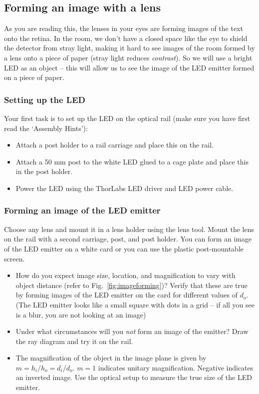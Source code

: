 \documentclass[a4paper]{report}
\begin{document}
    \subsection{Forming an image with a lens}
	\hypertarget{hintBack-image}{}
	As you are reading this, the lenses in your eyes are forming images of the text onto the retina.
	In the room, we don't have a closed space like the eye to shield the detector from stray light, making it hard to see images of the room formed by a lens onto a piece of paper (stray light reduces \emph{contrast}).
	So we will use a bright LED as an object -- this will allow us to see the image of the LED emitter formed on a piece of paper.

	\subsubsection{Setting up the LED}
	Your first task is to set up the LED on the optical rail (make sure you have first read the `Assembly Hints'):
	\begin{itemize}
    \item Attach a post holder to a rail carriage and place this on the rail.
    \item Attach a 50 mm post to the white LED glued to a cage plate and place this in the post holder.
    \item Power the LED using the ThorLabs LED driver and LED power cable.
	\end{itemize}

	\subsubsection{Forming an image of the LED emitter}
	Choose any lens and mount it in a lens holder using the lens tool.
	Mount the lens on the rail with a second carriage, post, and post holder.
	You can form an image of the LED emitter on a white card or you can use the plastic post-mountable screen.

    \begin{itemize}
	    \item How do you expect image size, location, and magnification to vary with object distance (refer to Fig.~\ref{fig:imageforming})? Verify that these are true by forming images of the LED emitter on the card for different values of $d_o$. (The LED emitter looks like a small square with dots in a grid -- if all you see is a blur, you are not looking at an image)
	    \item Under what circumstances will you \emph{not} form an image of the emitter? Draw the ray diagram and try it on the rail.
	    \item The magnification of the object in the image plane is given by  $m = h_i / h_o = d_i / d_o$. $m=1$ indicates unitary magnification. Negative indicates an inverted image.
	Use the optical setup to measure the true size of the LED emitter.
	\end{itemize}
\end{document}
